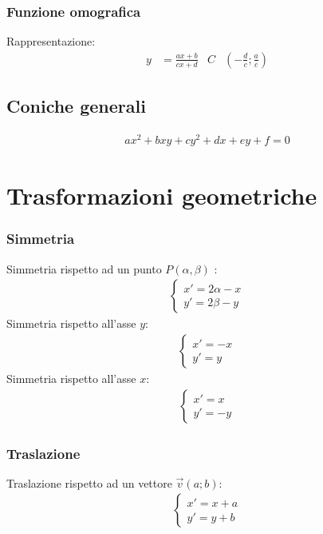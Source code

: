 \documentclass[a4paper]{article}
\begin{document}
	\subsubsection{Funzione omografica}
	Rappresentazione:
	\begin{align*}
	y &= \frac{ax + b}{cx + d}		&		C&\left( -\frac{d}{c} ; \frac{a}{c} \right)
	\end{align*}
	
	\subsection{Coniche generali}
	\begin{align*}
		ax^2+bxy+cy^2+dx+ey+f=0
	\end{align*}
	
	
	
	\newpage	
	\section{Trasformazioni geometriche}
	\subsubsection*{Simmetria}
	 Simmetria rispetto ad un punto $P(\alpha , \beta)$ :
	 \begin{align*}
	 	\begin{cases}
	 	x' = 2 \alpha - x \\
	 	y' = 2 \beta -y 
	 	\end{cases}
	 \end{align*}
	 Simmetria rispetto all'asse $y$:
	 \begin{align*}
	 	\begin{cases}
	 	x' = -x\\
	 	y' = y
	 	\end{cases}
	 \end{align*}
	Simmetria rispetto all'asse $x$:
	\begin{align*}
		\begin{cases}
			x' = x\\
			y' = -y
		\end{cases}
	\end{align*}
	
	\subsubsection*{Traslazione}
	Traslazione rispetto ad un vettore $\vec{v} (a;b)$:
	\begin{align*}
		\begin{cases}
			x'=x+a\\
			y'=y+b
		\end{cases}
	\end{align*}
	
\end{document}
